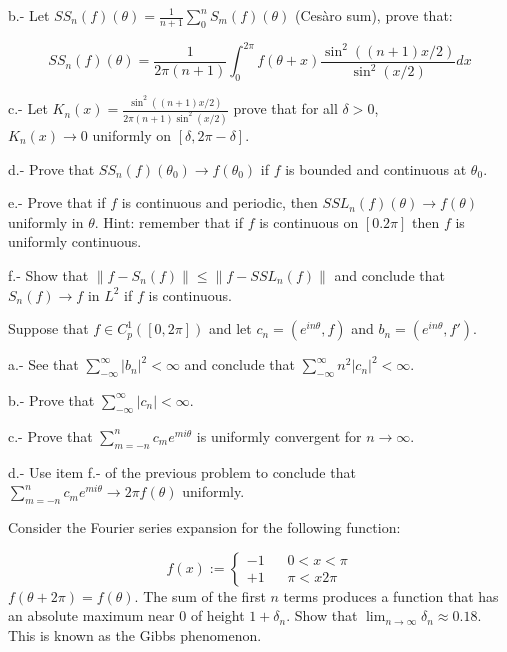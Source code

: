 b.- Let $SS_n(f)(\theta) = \frac{1}{n+1} \sum_0^n S_m(f)(\theta)$ (Cesàro sum), prove that:

\begin{equation}
  SS_n(f)(\theta) = \frac{1}{2\pi (n+1)} \int_0^{2\pi} f(\theta + x)
                           \frac{\sin^2((n+1)x/2)}{\sin^2(x/2)} dx
\end{equation}
%

c.- Let $K_n(x) = \frac{\sin^2((n+1)x/2)}{2\pi (n+1) \sin^2(x/2)}$ prove that for all $\delta > 0$, \hfill \\$K_n(x) \to 0$ uniformly on $[\delta, 2\pi-\delta]$.

d.- Prove that $SS_n(f)(\theta_0) \to f(\theta_0)$ if $f$ is bounded and continuous at $\theta_0$.

e.- Prove that if $f$ is continuous and periodic, then 
$SSL_n(f)(\theta) \to f(\theta)$ uniformly in $\theta$.
Hint: remember that if $f$ is continuous on $[0.2\pi]$ then $f$ is 
uniformly continuous.

f.- Show that $\| f-S_n(f)\| \leq \|f - SSL_n(f)\|$ and conclude that 
$S_n(f) \to f$ in $L^2$ if $f$ is continuous.

\epro

\bpro
Suppose that $f \in C_p^1([0,2\pi])$ and let $c_n = (e^{in\theta},f)$ and
$b_n = (e^{in\theta},f')$.

a.- See that $\sum_{-\infty}^{\infty} |b_n|^2 < \infty$ and conclude that 
    $\sum_{-\infty}^{\infty} n^2 |c_n|^2 < \infty$.

b.- Prove that $\sum_{-\infty}^{\infty} |c_n| < \infty$.

c.- Prove that $\sum_{m=-n}^{n} c_m e^{mi\theta}$ is uniformly convergent
for $n \to \infty$.

d.- Use item f.- of the previous problem to conclude that \hfill \\
     $\sum_{m=-n}^{n} c_m e^{mi\theta} \to 2\pi f(\theta)$
    uniformly.
\epro

\bpro
Consider the Fourier series expansion for the following function:


\begin{equation}
  f(x) := \left\{ \begin{array}{cc}
                      -1 & \;\;\; 0 < x < \pi \\
                      +1 & \;\;\; \pi < x 2\pi
                    \end{array}
                    \right.
\end{equation}
%
$f(\theta + 2\pi) = f(\theta)$.
The sum of the first $n$ terms produces a function that has an
absolute maximum near $0$ of height $1+ \delta_n$.
Show that $\lim_{n \to \infty} \delta_n \approx 0.18$. This is known as
the Gibbs phenomenon.
\epro


